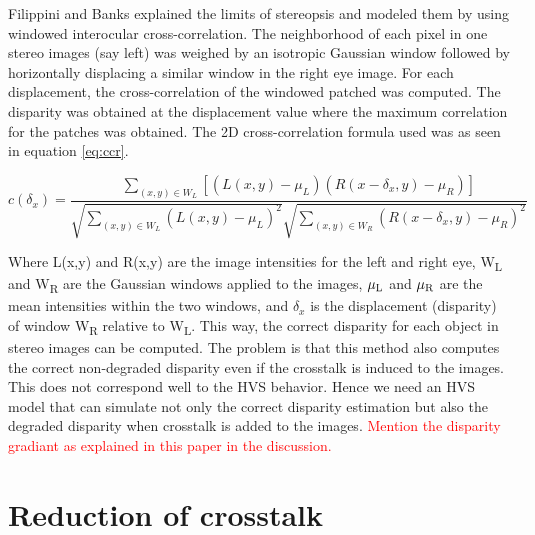 Filippini and Banks \cite{filippini2009limits} explained the limits of stereopsis and modeled them by using windowed interocular cross-correlation. The neighborhood of each pixel in one stereo images (say left) was weighed by an isotropic Gaussian window followed by horizontally displacing a similar window in the right eye image. For each displacement, the cross-correlation of the windowed patched was computed. The disparity was obtained at the displacement value where the maximum correlation for the patches was obtained. The 2D cross-correlation formula used was as seen in equation \ref{eq:ccr}.

\begin{equation}
c(\delta_x) = \frac{ \sum\limits_{(x,y) \in W_L} [(L(x,y) - \mu_L)(R(x-\delta_x, y) - \mu_R)] }{\sqrt{\sum\limits_{(x,y) \in W_L}(L(x,y) - \mu_L)^2} \sqrt{\sum\limits_{(x,y) \in W_R}(R(x-\delta_x, y)- \mu_R)^2}}
\label{eq:ccr}
\end{equation}

Where L(x,y) and R(x,y) are the image intensities for the left and right eye, W\textsubscript{L} and W\textsubscript{R} are the Gaussian windows applied to the images, $\mu\textsubscript{L}$ and $\mu\textsubscript{R}$ are the mean intensities within the two windows, and $\delta_x$ is the displacement (disparity) of window W\textsubscript{R} relative to W\textsubscript{L}. This way, the correct disparity for each object in stereo images can be computed. The problem is that this method also computes the correct non-degraded disparity even if the crosstalk is induced to the images. This does not correspond well to the HVS behavior. Hence we need an HVS model that can simulate not only the correct disparity estimation but also the degraded disparity when crosstalk is added to the images. \textcolor{red}{Mention the disparity gradiant as explained in this paper in the discussion.}

\section{Reduction of crosstalk}

